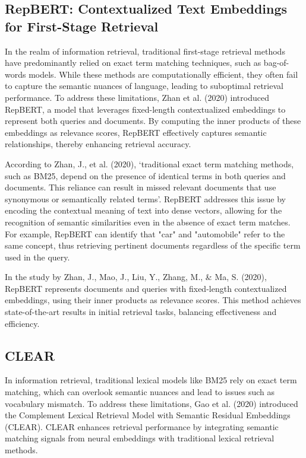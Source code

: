\subsection{RepBERT: Contextualized Text Embeddings for First-Stage Retrieval}

In the realm of information retrieval, traditional first-stage retrieval methods have predominantly relied on exact term matching techniques, such as bag-of-words models. While these methods are computationally efficient, they often fail to capture the semantic nuances of language, leading to suboptimal retrieval performance. To address these limitations, Zhan et al. (2020) introduced RepBERT, a model that leverages fixed-length contextualized embeddings to represent both queries and documents. By computing the inner products of these embeddings as relevance scores, RepBERT effectively captures semantic relationships, thereby enhancing retrieval accuracy.

According to Zhan, J., et al. (2020), ‘traditional exact term matching methods, such as BM25, depend on the presence of identical terms in both queries and documents. This reliance can result in missed relevant documents that use synonymous or semantically related terms’. RepBERT addresses this issue by encoding the contextual meaning of text into dense vectors, allowing for the recognition of semantic similarities even in the absence of exact term matches. For example, RepBERT can identify that "car" and "automobile" refer to the same concept, thus retrieving pertinent documents regardless of the specific term used in the query.

In the study by Zhan, J., Mao, J., Liu, Y., Zhang, M., \& Ma, S. (2020), RepBERT represents documents and queries with fixed-length contextualized embeddings, using their inner products as relevance scores. This method achieves state-of-the-art results in initial retrieval tasks, balancing effectiveness and efficiency.

\subsection{CLEAR}

In information retrieval, traditional lexical models like BM25 rely on exact term matching, which can overlook semantic nuances and lead to issues such as vocabulary mismatch. To address these limitations, Gao et al. (2020) introduced the Complement Lexical Retrieval Model with Semantic Residual Embeddings (CLEAR). CLEAR enhances retrieval performance by integrating semantic matching signals from neural embeddings with traditional lexical retrieval methods.

